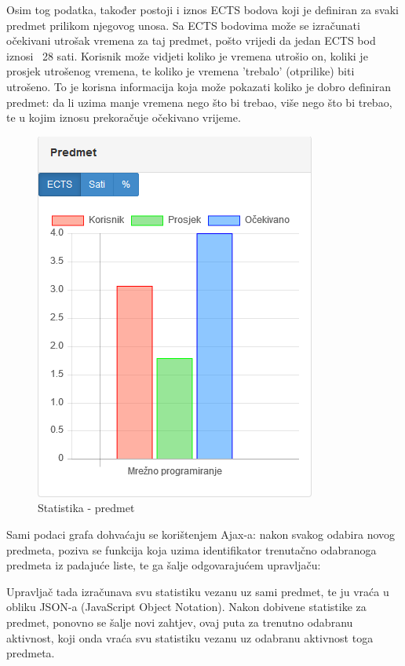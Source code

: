 \documentclass[times, utf8, zavrsni]{fer}
\begin{document}
Osim tog podatka, također postoji i iznos ECTS bodova koji je definiran za svaki predmet prilikom njegovog unosa. Sa ECTS bodovima može se izračunati očekivani utrošak vremena za taj predmet, pošto vrijedi da jedan ECTS bod iznosi ~28 sati. Korisnik može vidjeti koliko je vremena utrošio on, koliki je prosjek utrošenog vremena, te koliko je vremena 'trebalo' (otprilike) biti utrošeno. To je korisna informacija koja može pokazati koliko je dobro definiran predmet: da li uzima manje vremena nego što bi trebao, više nego što bi trebao, te u kojim iznosu prekoračuje očekivano vrijeme.

\begin{figure}[H]
\centering
\includegraphics{img/statistika-predmet.png}
\caption{Statistika - predmet}
\label{fig:statistika-predmet}
\end{figure}

Sami podaci grafa dohvaćaju se korištenjem Ajax-a: nakon svakog odabira novog predmeta, poziva se funkcija koja uzima identifikator trenutačno odabranoga predmeta iz padajuće liste, te ga šalje odgovarajućem upravljaču:

\lstset{style=js}


Upravljač tada izračunava svu statistiku vezanu uz sami predmet, te ju vraća u obliku JSON-a (JavaScript Object Notation). Nakon dobivene statistike za predmet, ponovno se šalje novi zahtjev, ovaj puta za trenutno odabranu aktivnost, koji onda vraća svu statistiku vezanu uz odabranu aktivnost toga predmeta.
\end{document}
